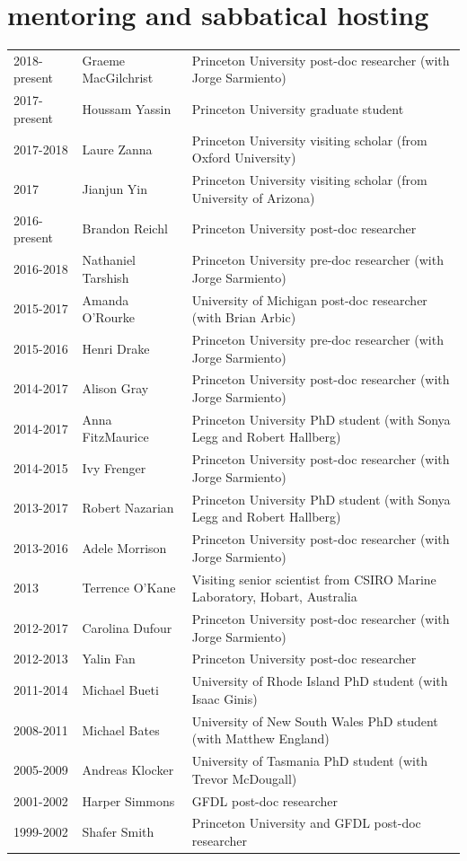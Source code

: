 \documentclass{article}
\begin{document}
\section*{\sc  \color{Maroon} mentoring and sabbatical hosting}
\vspace{-.25cm}

\begin{tabular}{lll}
2018-present & Graeme MacGilchrist & Princeton University post-doc researcher (with Jorge Sarmiento) \\ 
2017-present & Houssam Yassin & Princeton University graduate student \\ 
2017-2018 & Laure Zanna  & Princeton University visiting scholar (from Oxford University)  \\
2017 & Jianjun Yin       & Princeton University visiting scholar (from University of Arizona)  \\
2016-present & Brandon Reichl       & Princeton University post-doc researcher  \\
2016-2018 & Nathaniel Tarshish & Princeton University pre-doc researcher (with Jorge Sarmiento) \\
2015-2017 & Amanda O'Rourke  & University of Michigan post-doc researcher (with Brian Arbic) \\
2015-2016    & Henri Drake             & Princeton University pre-doc researcher (with Jorge Sarmiento) \\
2014-2017 & Alison Gray            & Princeton University post-doc researcher (with Jorge Sarmiento) \\
2014-2017 & Anna FitzMaurice   & Princeton University PhD student (with Sonya Legg and Robert Hallberg) \\ 
2014-2015     & Ivy Frenger            & Princeton University post-doc researcher (with Jorge Sarmiento) \\
2013-2017 & Robert Nazarian    & Princeton University PhD student (with Sonya Legg and Robert Hallberg) \\ 
2013-2016     & Adele Morrison     & Princeton University post-doc researcher (with Jorge Sarmiento) \\
2013               & Terrence O'Kane   & Visiting senior scientist from CSIRO Marine Laboratory, Hobart, Australia \\
2012-2017     & Carolina Dufour   & Princeton University post-doc researcher (with Jorge Sarmiento)  \\
2012-2013     & Yalin Fan              & Princeton University post-doc researcher \\
2011-2014     & Michael Bueti       & University of Rhode Island  PhD student (with Isaac Ginis) \\
2008-2011     & Michael Bates       & University of New South Wales PhD student (with Matthew England) \\
2005-2009     & Andreas Klocker   & University of Tasmania  PhD student (with Trevor McDougall) \\
2001-2002     & Harper Simmons   & GFDL post-doc researcher \\
1999-2002     & Shafer Smith         & Princeton University and GFDL post-doc researcher     \\
\end{tabular}
\end{document}
